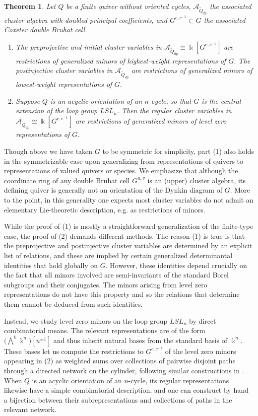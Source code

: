 \documentclass[12pt]{amsart}
\newcommand{\cA}{\mathcal{A}}
\newcommand{\kk}{\Bbbk}
\newcommand{\Qdp}{\widetilde{Q}_{dp}}
\newcommand{\loopvar}{u}
\newtheorem{theorem}{Theorem}[section]
\theoremstyle{remark}
\numberwithin{equation}{section}
\numberwithin{figure}{section}
\begin{document}
\begin{theorem}\label{thm:maintheorem}
  Let $Q$ be a finite quiver without oriented cycles, $\cA_{\Qdp}$ the associated cluster algebra with doubled principal coefficients, and $G^{c,c^{-1}} \subset G$ the associated Coxeter double Bruhat cell.
  \begin{enumerate}
    \item 
      The preprojective and initial cluster variables in $\cA_{\Qdp} \cong \kk[G^{c,c^{-1}}]$ are restrictions of generalized minors of highest-weight representations of $G$.
      The postinjective cluster variables in $\cA_{\Qdp}$ are restrictions of generalized minors of lowest-weight representations of $G$.
    \item 
      Suppose $Q$ is an acyclic orientation of an $n$-cycle, so that $G$ is the central extension of the loop group $LSL_n$.
      Then the regular cluster variables in $\cA_{\Qdp}\cong \kk[G^{c,c^{-1}}]$ are restrictions of generalized minors of level zero representations of $G$.
  \end{enumerate}
\end{theorem}

Though above we have taken $G$ to be symmetric for simplicity, part (1) also holds in the symmetrizable case upon generalizing from representations of quivers to representations of valued quivers or species. 
We emphasize that although the coordinate ring of any double Bruhat cell $G^{u,v}$ is an (upper) cluster algebra, its defining quiver is generally not an orientation of the Dynkin diagram of $G$. More to the point, in this generality one expects most cluster variables do not admit an elementary Lie-theoretic description, e.g. as restrictions of minors.

While the proof of (1) is mostly a straightforward generalization of the finite-type case, the proof of (2) demands different methods.
The reason (1) is true is that the preprojective and postinjective cluster variables are determined by an explicit list of relations, and these are implied by certain generalized determinantal identities that hold globally on $G$.
However, these identities depend crucially on the fact that all minors involved are semi-invariants of the standard Borel subgroups and their conjugates.
The minors arising from level zero representations do not have this property and so the relations that determine them cannot be deduced from such identities.

Instead, we study level zero minors on the loop group $LSL_n$ by direct combinatorial means.
The relevant representations are of the form $\big(\!\bigwedge^{\!k}\kk^n\big)[\loopvar^{\pm 1}]$ and thus inherit natural bases from the standard basis of $\kk^n$.
These bases let us compute the restrictions to $G^{c,c^{-1}}$ of the level zero minors appearing in (2) as weighted sums over collections of pairwise disjoint paths through a directed network on the cylinder, following similar constructions in \cite{GSV12,FM14}.
When $Q$ is an acyclic orientation of an $n$-cycle, its regular representations likewise have a simple combinatorial description, and one can construct by hand a bijection between their subrepresentations and collections of paths in the relevant network.
\end{document}
